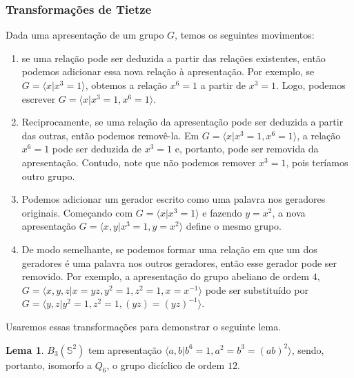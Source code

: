 \documentclass[a4paper,portuguese,11pt,twoside, leqno]{book}
\theoremstyle{definition}
\newtheorem{lemma}[theorem]{Lema}
\begin{document}
	\subsubsection{Transformações de Tietze}
	\hspace{12pt} Dada uma apresentação de um grupo $G$, temos os seguintes movimentos:
	\begin{enumerate}
		\item se uma relação pode ser deduzida a partir das relações existentes, então podemos adicionar essa nova relação à apresentação. Por exemplo, se $G = \langle x|x^3=1 \rangle$, obtemos a relação $x^6 = 1$ a partir de $x^3=1$. Logo, podemos escrever $G = \langle x|x^3=1,x^6=1 \rangle$.
		\item Reciprocamente, se uma relação da apresentação pode ser deduzida a partir das outras, então podemos removê-la. Em $G = \langle x|x^3=1,x^6=1 \rangle$, a relação $x^6=1$ pode ser deduzida de $x^3=1$ e, portanto, pode ser removida da apresentação. Contudo, note que não podemos remover $x^3=1$, pois teríamos outro grupo.
		\item Podemos adicionar um gerador escrito como uma palavra nos geradores originais. Começando com $G = \langle x|x^3=1 \rangle$ e fazendo $y=x^2$, a nova apresentação $G = \langle x,y|x^3=1,y=x^2 \rangle$ define o mesmo grupo.
		\item De modo semelhante, se podemos formar uma relação em que um dos geradores é uma palavra nos outros geradores, então esse gerador pode ser removido. Por exemplo, a apresentação do grupo abeliano de ordem $4$, $G = \langle x,y,z|x=yz, y^2=1, z^2=1, x=x^{-1} \rangle$ pode ser substituído por $G = \langle y,z|y^2=1,z^2=1,(yz)=(yz)^{-1} \rangle$.
	\end{enumerate}
	
	\par\vspace{0.3cm} Usaremos essas transformações para demonstrar o seguinte lema.
	
	\begin{lemma}
		\label{B_3(S^2) tem ordem 12}
		$B_3(\mathbb{S}^2)$ tem apresentação $\langle a,b|b^6=1,a^2=b^3=(ab)^2 \rangle$, sendo, portanto, isomorfo a $Q_6$, o grupo dicíclico de ordem $12$. 
	\end{lemma} 
	
\end{document}
